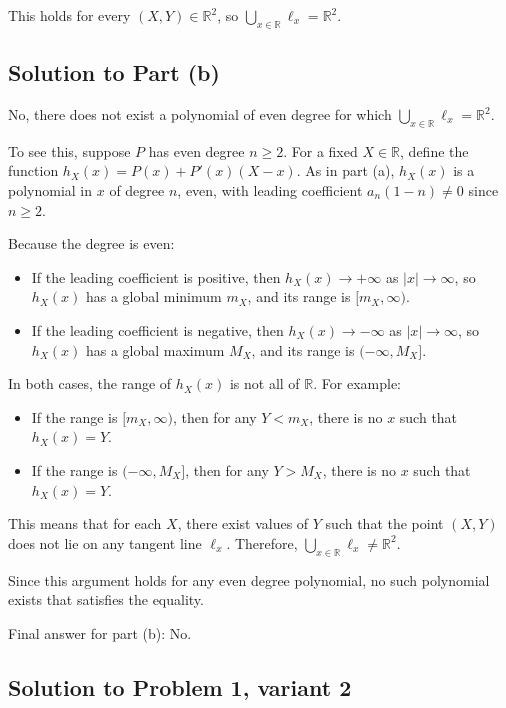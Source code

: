 \documentclass[12pt,a4paper]{article}
\theoremstyle{definition}
\begin{document}
This holds for every $(X, Y) \in \mathbb{R}^2$, so $\bigcup_{x \in \mathbb{R}} \ell_x = \mathbb{R}^2$.

\subsection*{Solution to Part (b)}

No, there does not exist a polynomial of even degree for which $\bigcup_{x \in \mathbb{R}} \ell_x = \mathbb{R}^2$.

To see this, suppose $P$ has even degree $n \geq 2$. For a fixed $X \in \mathbb{R}$, define the function $h_X(x) = P(x) + P'(x)(X - x)$. As in part (a), $h_X(x)$ is a polynomial in $x$ of degree $n$, even, with leading coefficient $a_n (1 - n) \neq 0$ since $n \geq 2$.

Because the degree is even:
\begin{itemize}
\item If the leading coefficient is positive, then $h_X(x) \to +\infty$ as $|x| \to \infty$, so $h_X(x)$ has a global minimum $m_X$, and its range is $[m_X, \infty)$.
\item If the leading coefficient is negative, then $h_X(x) \to -\infty$ as $|x| \to \infty$, so $h_X(x)$ has a global maximum $M_X$, and its range is $(-\infty, M_X]$.
\end{itemize}

In both cases, the range of $h_X(x)$ is not all of $\mathbb{R}$. For example:
\begin{itemize}
\item If the range is $[m_X, \infty)$, then for any $Y < m_X$, there is no $x$ such that $h_X(x) = Y$.
\item If the range is $(-\infty, M_X]$, then for any $Y > M_X$, there is no $x$ such that $h_X(x) = Y$.
\end{itemize}

This means that for each $X$, there exist values of $Y$ such that the point $(X, Y)$ does not lie on any tangent line $\ell_x$. Therefore, $\bigcup_{x \in \mathbb{R}} \ell_x \neq \mathbb{R}^2$.

Since this argument holds for any even degree polynomial, no such polynomial exists that satisfies the equality.

Final answer for part (b): No.

\subsection{Solution to Problem 1, variant 2}
\end{document}

